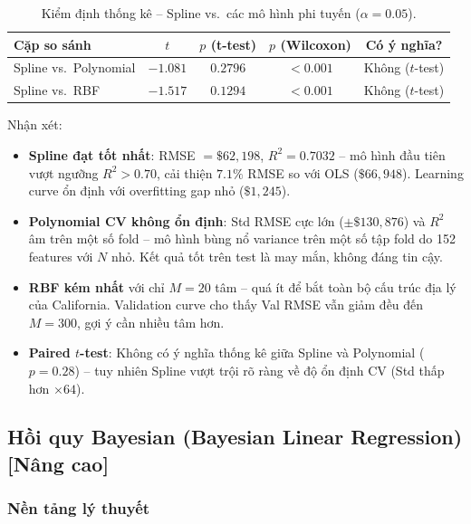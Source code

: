 \documentclass[12pt, a4paper]{article}
\begin{document}
\begin{table}[H]
  \centering
  \caption{Kiểm định thống kê -- Spline vs.\ các mô hình phi tuyến ($\alpha=0.05$).}
  \label{tab:nonlinear_stat}
  \begin{tabular}{lcccc}
    \toprule
    \textbf{Cặp so sánh} & $t$ & $p$ (t-test) & $p$ (Wilcoxon)
      & \textbf{Có ý nghĩa?} \\
    \midrule
    Spline vs.\ Polynomial
      & $-1.081$ & $0.2796$ & $< 0.001$ & Không ($t$-test) \\
    Spline vs.\ RBF
      & $-1.517$ & $0.1294$ & $< 0.001$ & Không ($t$-test) \\
    \bottomrule
  \end{tabular}
\end{table}

Nhận xét:
\begin{itemize}
  \item \textbf{Spline đạt tốt nhất}: RMSE $= \$62{,}198$,
        $R^2 = 0.7032$ -- mô hình đầu tiên vượt ngưỡng $R^2 > 0.70$,
        cải thiện $\mathbf{7.1\%}$ RMSE so với OLS ($\$66{,}948$).
        Learning curve ổn định với overfitting gap nhỏ ($\$1{,}245$).
  \item \textbf{Polynomial CV không ổn định}: Std RMSE cực lớn
        ($\pm\$130{,}876$) và $R^2$ âm trên một số fold -- mô hình
        bùng nổ variance trên một số tập fold do 152 features với
        $N$ nhỏ. Kết quả tốt trên test là may mắn, không đáng tin cậy.
  \item \textbf{RBF kém nhất} với chỉ $M = 20$ tâm -- quá ít để bắt
        toàn bộ cấu trúc địa lý của California. Validation curve cho
        thấy Val RMSE vẫn giảm đều đến $M = 300$, gợi ý cần nhiều
        tâm hơn.
  \item \textbf{Paired $t$-test}: Không có ý nghĩa thống kê giữa
        Spline và Polynomial ($p = 0.28$) -- tuy nhiên Spline vượt
        trội rõ ràng về độ ổn định CV (Std thấp hơn $\times 64$).
\end{itemize}

\subsection{Hồi quy Bayesian (Bayesian Linear Regression) [Nâng cao]}
\label{ssec:bayesian}

\subsubsection{Nền tảng lý thuyết}
\end{document}
